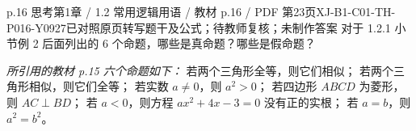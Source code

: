 \par\noindent\begin{minipage}{\linewidth}
\begin{bankitem}{p.16 思考}{第1章 / 1.2 常用逻辑用语 / 教材 p.16 / PDF 第23页}{XJ-B1-C01-TH-P016-Y0927}{已对照原页转写题干及公式；待教师复核；未制作答案}
对于 1.2.1 小节例 2 后面列出的 6 个命题，哪些是真命题？哪些是假命题？
\par\textit{所引用的教材 p.15 六个命题如下：}
若两个三角形全等，则它们相似；
若两个三角形相似，则它们全等；
若实数 $a\ne0$，则 $a^2>0$；
若四边形 $ABCD$ 为菱形，则 $AC\perp BD$；
若 $a<0$，则方程 $ax^2+4x-3=0$ 没有正的实根；
若 $a=b$，则 $a^2=b^2$。
\end{bankitem}
\end{minipage}\par\medskip
